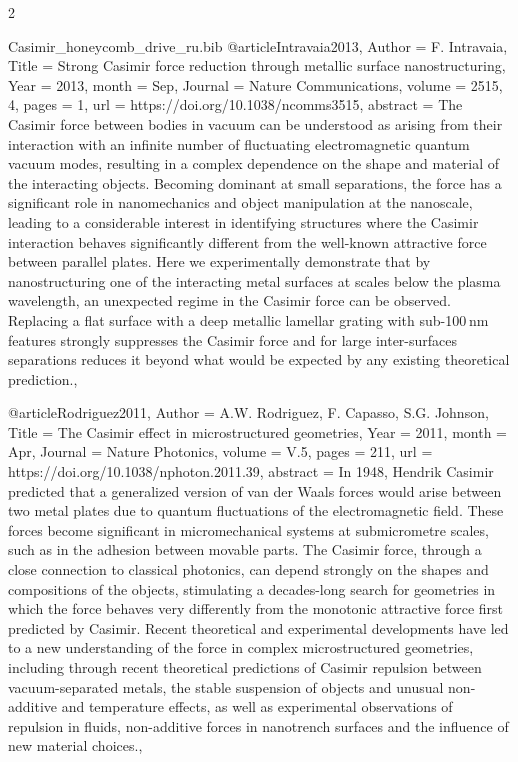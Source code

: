 \documentclass[twoside, 10pt]{article}
\def\myfilename{Casimir_honeycomb_drive_ru}
\begin{document}
\begin{multicols}{2}
\begin{filecontents}{\myfilename.bib}
@article{Intravaia2013,
    Author = {F. Intravaia},
    Title = {Strong Casimir force reduction through metallic surface nanostructuring},
    Year = {2013},
    month = {Sep},
    Journal = {Nature Communications},
    volume = {2515, 4},
    pages = {1},
    url = {https://doi.org/10.1038/ncomms3515},
    abstract = {The Casimir force between bodies in vacuum can be understood as arising from their interaction with an infinite number of fluctuating electromagnetic quantum vacuum modes, resulting in a complex dependence on the shape and material of the interacting objects. Becoming dominant at small separations, the force has a significant role in nanomechanics and object manipulation at the nanoscale, leading to a considerable interest in identifying structures where the Casimir interaction behaves significantly different from the well-known attractive force between parallel plates. Here we experimentally demonstrate that by nanostructuring one of the interacting metal surfaces at scales below the plasma wavelength, an unexpected regime in the Casimir force can be observed. Replacing a flat surface with a deep metallic lamellar grating with sub-100 nm features strongly suppresses the Casimir force and for large inter-surfaces separations reduces it beyond what would be expected by any existing theoretical prediction.},
}



@article{Rodriguez2011,
    Author = {A.W. Rodriguez, F. Capasso, S.G. Johnson},
    Title = {The Casimir effect in microstructured geometries},
    Year = {2011},
    month = {Apr},
    Journal = {Nature Photonics},
    volume = {V.5},
    pages = {211},
    url = {https://doi.org/10.1038/nphoton.2011.39},
    abstract = {In 1948, Hendrik Casimir predicted that a generalized version of van der Waals forces would arise between two metal plates due to quantum fluctuations of the electromagnetic field. These forces become significant in micromechanical systems at submicrometre scales, such as in the adhesion between movable parts. The Casimir force, through a close connection to classical photonics, can depend strongly on the shapes and compositions of the objects, stimulating a decades-long search for geometries in which the force behaves very differently from the monotonic attractive force first predicted by Casimir. Recent theoretical and experimental developments have led to a new understanding of the force in complex microstructured geometries, including through recent theoretical predictions of Casimir repulsion between vacuum-separated metals, the stable suspension of objects and unusual non-additive and temperature effects, as well as experimental observations of repulsion in fluids, non-additive forces in nanotrench surfaces and the influence of new material choices.},
}


\end{filecontents}
\end{multicols}
\end{document}
